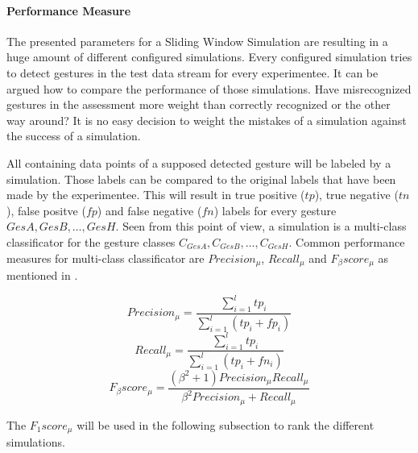 \paragraph{Performance Measure} \label{performance_measure}
The presented parameters for a Sliding Window Simulation are resulting in a huge amount of different configured
simulations. Every configured simulation tries to detect gestures in the test data stream for every experimentee. It can
be argued how to compare the performance of those simulations. Have misrecognized gestures in the assessment more weight
than correctly recognized or the other way around? It is no easy decision to weight the mistakes of a simulation against
the success of a simulation.

All containing data points of a supposed detected gesture will be labeled by a simulation. Those labels can be compared
to the original labels that have been made by the experimentee. This will result in true positive ($tp$), true negative
($tn$), false positve ($fp$) and false negative ($fn$) labels for every gesture $GesA, GesB, \dots, GesH$. Seen from
this point of view, a simulation is a multi-class classificator for the gesture classes
$C_{GesA}, C_{GesB}, \dots, C_{GesH}$. Common performance measures for multi-class classificator are $Precision_{\mu}$,
$Recall_{\mu}$ and $F_{\beta}score_{\mu}$ as mentioned in \cite{sokolova2009systematic}.

\begin{equation}
    Precision_{\mu} = \frac{\sum \limits_{i=1}^{l} tp_i}{\sum \limits_{i=1}^{l} (tp_i + fp_i)}
\end{equation}
\begin{equation}
    Recall_{\mu} = \frac{\sum \limits_{i=1}^{l} tp_i}{\sum \limits_{i=1}^{l} (tp_i + fn_i)}
\end{equation}
\begin{equation}
    F_{\beta}score_{\mu} = \frac{(\beta^2 + 1)Precision_{\mu} Recall_{\mu}}{\beta^2 Precision_{\mu} + Recall_{\mu}}
\end{equation}

The $F_{1}score_{\mu}$ will be used in the following subsection to rank the different simulations.
